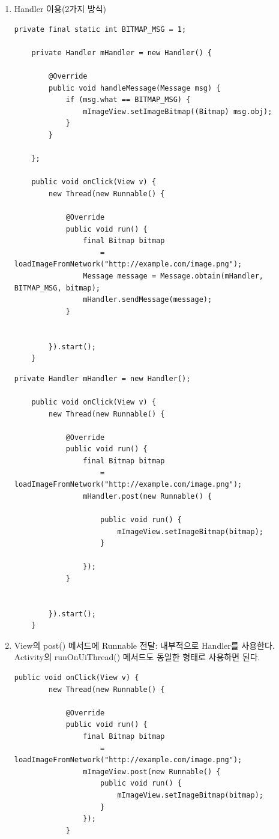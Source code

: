 \begin{enumerate}
\item Handler 이용(2가지 방식)
\begin{lstlisting}[frame=single]
	private final static int BITMAP_MSG = 1;
	
	private Handler mHandler = new Handler() {
		
		@Override
		public void handleMessage(Message msg) {
			if (msg.what == BITMAP_MSG) {
				mImageView.setImageBitmap((Bitmap) msg.obj);
			}
		}
		
	};
	
	public void onClick(View v) {
    	new Thread(new Runnable() {
    		
    		@Override
        	public void run() {
            	final Bitmap bitmap 
            		= loadImageFromNetwork("http://example.com/image.png");
            	Message message = Message.obtain(mHandler, BITMAP_MSG, bitmap);
            	mHandler.sendMessage(message);
        	}

	
    	}).start();
	}
\end{lstlisting}

\begin{lstlisting}[frame=single]
	private Handler mHandler = new Handler();
	
	public void onClick(View v) {
    	new Thread(new Runnable() {
    	
    		@Override
        	public void run() {
            	final Bitmap bitmap 
            		= loadImageFromNetwork("http://example.com/image.png");
            	mHandler.post(new Runnable() {
            		
                	public void run() {
                    	mImageView.setImageBitmap(bitmap);
                	}
                	
            	});
        	}

	
    	}).start();
	}
\end{lstlisting}

\item View의 post() 메서드에 Runnable 전달: 내부적으로 Handler를 사용한다. Activity의 runOnUiThread() 메서드도 동일한 형태로 사용하면 된다.
\begin{lstlisting}[frame=single] 
	public void onClick(View v) {
    	new Thread(new Runnable() {
    	
    		@Override
        	public void run() {
            	final Bitmap bitmap
            		= loadImageFromNetwork("http://example.com/image.png");
            	mImageView.post(new Runnable() {
                	public void run() {
                    	mImageView.setImageBitmap(bitmap);
                	}
            	});
        	}
        	

\end{lstlisting}
\end{enumerate}
